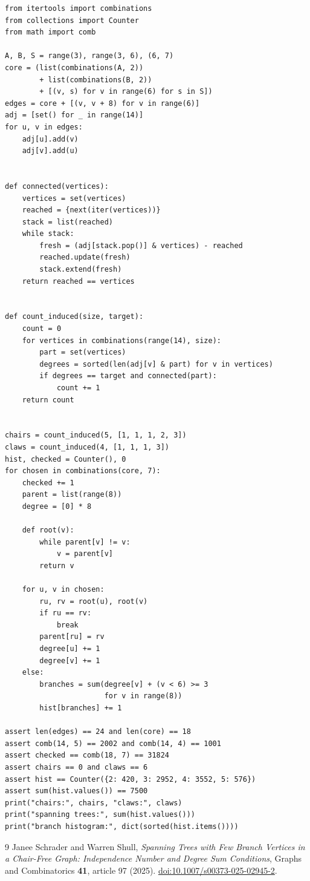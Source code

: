 \documentclass[11pt]{article}
\theoremstyle{remark}
\begin{document}
\begin{lstlisting}
from itertools import combinations
from collections import Counter
from math import comb

A, B, S = range(3), range(3, 6), (6, 7)
core = (list(combinations(A, 2))
        + list(combinations(B, 2))
        + [(v, s) for v in range(6) for s in S])
edges = core + [(v, v + 8) for v in range(6)]
adj = [set() for _ in range(14)]
for u, v in edges:
    adj[u].add(v)
    adj[v].add(u)


def connected(vertices):
    vertices = set(vertices)
    reached = {next(iter(vertices))}
    stack = list(reached)
    while stack:
        fresh = (adj[stack.pop()] & vertices) - reached
        reached.update(fresh)
        stack.extend(fresh)
    return reached == vertices


def count_induced(size, target):
    count = 0
    for vertices in combinations(range(14), size):
        part = set(vertices)
        degrees = sorted(len(adj[v] & part) for v in vertices)
        if degrees == target and connected(part):
            count += 1
    return count


chairs = count_induced(5, [1, 1, 1, 2, 3])
claws = count_induced(4, [1, 1, 1, 3])
hist, checked = Counter(), 0
for chosen in combinations(core, 7):
    checked += 1
    parent = list(range(8))
    degree = [0] * 8

    def root(v):
        while parent[v] != v:
            v = parent[v]
        return v

    for u, v in chosen:
        ru, rv = root(u), root(v)
        if ru == rv:
            break
        parent[ru] = rv
        degree[u] += 1
        degree[v] += 1
    else:
        branches = sum(degree[v] + (v < 6) >= 3
                       for v in range(8))
        hist[branches] += 1

assert len(edges) == 24 and len(core) == 18
assert comb(14, 5) == 2002 and comb(14, 4) == 1001
assert checked == comb(18, 7) == 31824
assert chairs == 0 and claws == 6
assert hist == Counter({2: 420, 3: 2952, 4: 3552, 5: 576})
assert sum(hist.values()) == 7500
print("chairs:", chairs, "claws:", claws)
print("spanning trees:", sum(hist.values()))
print("branch histogram:", dict(sorted(hist.items())))
\end{lstlisting}

\begin{thebibliography}{9}
Janee Schrader and Warren Shull,
\emph{Spanning Trees with Few Branch Vertices in a Chair-Free Graph:
Independence Number and Degree Sum Conditions},
Graphs and Combinatorics \textbf{41}, article 97 (2025).
\href{https://doi.org/10.1007/s00373-025-02945-2}{doi:10.1007/s00373-025-02945-2}.
\end{thebibliography}
\end{document}
